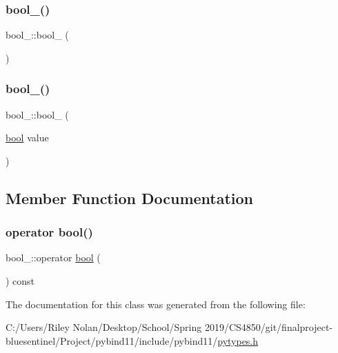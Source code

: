 \subsubsection{\texorpdfstring{bool\_()}{bool\_()}\hspace{0.1cm}{\footnotesize\ttfamily [1/2]}}
{\footnotesize\ttfamily bool\+\_\+\+::bool\+\_\+ (\begin{DoxyParamCaption}{ }\end{DoxyParamCaption})\hspace{0.3cm}{\ttfamily [inline]}}

\mbox{\label{classbool___a9a6df8a2673d2c7652afc7ffd284d947}} 
\subsubsection{\texorpdfstring{bool\_()}{bool\_()}\hspace{0.1cm}{\footnotesize\ttfamily [2/2]}}
{\footnotesize\ttfamily bool\+\_\+\+::bool\+\_\+ (\begin{DoxyParamCaption}\item[{\mbox{\hyperlink{asdl_8h_af6a258d8f3ee5206d682d799316314b1}{bool}}}]{value }\end{DoxyParamCaption})\hspace{0.3cm}{\ttfamily [inline]}}



\subsection{Member Function Documentation}
\mbox{\label{classbool___a0a11b757daab484712417847ea09ff26}} 
\subsubsection{\texorpdfstring{operator bool()}{operator bool()}}
{\footnotesize\ttfamily bool\+\_\+\+::operator \mbox{\hyperlink{asdl_8h_af6a258d8f3ee5206d682d799316314b1}{bool}} (\begin{DoxyParamCaption}{ }\end{DoxyParamCaption}) const\hspace{0.3cm}{\ttfamily [inline]}}



The documentation for this class was generated from the following file\+:\begin{DoxyCompactItemize}
\item 
C\+:/\+Users/\+Riley Nolan/\+Desktop/\+School/\+Spring 2019/\+C\+S4850/git/finalproject-\/bluesentinel/\+Project/pybind11/include/pybind11/\mbox{\hyperlink{pytypes_8h}{pytypes.\+h}}\end{DoxyCompactItemize}
